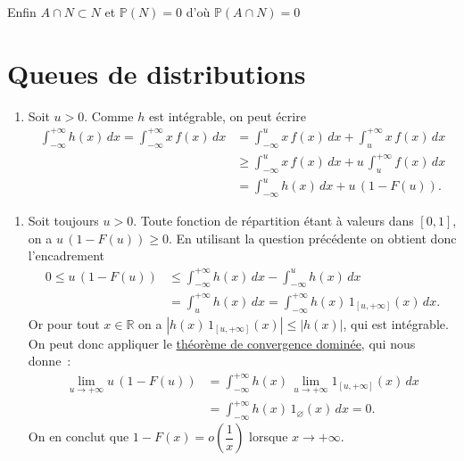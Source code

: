 Enfin \(A \cap N \subset N\) et \(\mathbb{P}(N) = 0\) d'où
\(\mathbb{P}(A \cap N) = 0\)

\section{Queues de distributions}\label{I-queues-de-distributions-1}

\label{I-answer-dlfdr-pi}

\begin{enumerate}
\def\labelenumi{\arabic{enumi}.}
\tightlist
\item
  Soit \(u>0\). Comme \(h\) est intégrable, on peut écrire
  \begin{align*}
  \int_{-\infty}^{+\infty} h(x)\,dx = \int_{-\infty}^{+\infty} x\,f(x)\,dx & = \int_{-\infty}^{u} x\,f(x)\,dx + \int_{u}^{+\infty} x\,f(x)\,dx\\
  &\geq \int_{-\infty}^{u} x\,f(x)\,dx + u\,\int_{u}^{+\infty} f(x)\,dx\\
  &= \int_{-\infty}^{u} h(x)\,dx + u\,\left(1- F(u)\right).
  \end{align*}
\end{enumerate}

\begin{enumerate}
\def\labelenumi{\arabic{enumi}.}
\setcounter{enumi}{1}
\tightlist
\item
  Soit toujours \(u>0\). Toute fonction de répartition étant à valeurs
  dans \([0,1]\), on a \(u\,\left(1-F(u)\right) \geq 0\). En utilisant
  la question précédente on obtient donc l'encadrement \begin{align*}
  0 \leq u\,\left(1-F(u)\right) & \leq \int_{-\infty}^{+\infty} h(x)\,dx - \int_{-\infty}^u h(x)\,dx\\
  &= \int_{u}^{+\infty} h(x)\,dx = \int_{-\infty}^{+\infty} h(x)\,1_{[u,+\infty]}(x)\,dx.
  \end{align*} Or pour tout \(x\in \mathbb{R}\) on a
  \(\left|h(x)\,1_{[u,+\infty]}(x)\right| \leq \left|h(x)\right|\), qui
  est intégrable. On peut donc appliquer le
  \href{Calcul\%20Intégral\%20II.pdf\%20\#TCD}{théorème de convergence
  dominée}, qui nous donne~: \begin{align*}
  \lim_{u\to+\infty} u\,(1-F(u)) & = \int_{-\infty}^{+\infty} h(x)\,\lim_{u\to+\infty} 1_{[u,+\infty]}(x)\,dx\\
  & = \int_{-\infty}^{+\infty} h(x)\,1_{\varnothing}(x)\,dx = 0.
  \end{align*} On en conclut que \(1-F(x) = o\left(\dfrac{1}{x}\right)\)
  lorsque \(x\to+\infty\).
\end{enumerate}


